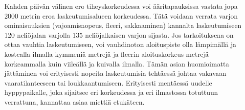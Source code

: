 Kahden päivän välinen ero tiheyskorkeudessa voi ääritapauksissa vastata jopa 2000 metrin eroa laskeutumisalueen korkeudessa. Tätä voidaan verrata varjon ominaisuuksien (vajoamisnopeus, fleeri, sakkaaminen) kannalta laskeutumiseen 120 neliöjalan varjolla 135 neliöjalkaisen varjon sijasta. Jos tarkoituksena on ottaa vauhtia laskeutumiseen, voi vauhdinoton aloituspiste olla lämpimällä ja kostealla ilmalla kymmeniä metrejä ja fleerin aloituskorkeus metrejä korkeammalla kuin viileällä ja kuivalla ilmalla. Tämän asian huomioimatta jättäminen voi erityisesti nopeita laskeutumisia tehtäessä johtaa vakavaan vaaratilanteeseen tai loukkaantumiseen. Erityisesti mentäessä uudelle hyppypaikalle, joka sijaitsee eri korkeudessa ja eri ilmastossa totuttuun verrattuna, kannattaa asiaa miettiä etukäteen. 

